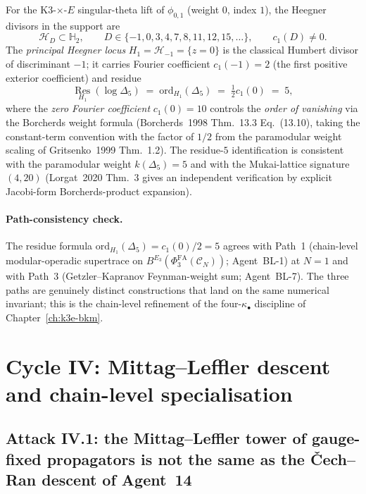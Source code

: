 For the K3-$\times$-$E$ singular-theta lift of $\phi_{0,1}$ (weight $0$,
index $1$), the Heegner divisors in the support are
\begin{equation}
\label{eq:heegner-support}
 \mathcal{H}_D \subset \mathbb{H}_2, \qquad D \in \{-1, 0, 3, 4, 7, 8,
 11, 12, 15, \ldots\}, \qquad c_1(D) \neq 0.
\end{equation}
The \emph{principal Heegner locus} $H_1 = \mathcal{H}_{-1} = \{z = 0\}$
is the classical Humbert divisor of discriminant $-1$; it carries
Fourier coefficient $c_1(-1) = 2$ (the first positive exterior
coefficient) and residue
\begin{equation}
\label{eq:residue-at-H1}
 \operatorname*{Res}_{H_1}( \log \Delta_5 )
 \;=\; \mathrm{ord}_{H_1}(\Delta_5)
 \;=\; \tfrac{1}{2} c_1(0) \;=\; 5,
\end{equation}
where the \emph{zero Fourier coefficient} $c_1(0) = 10$ controls the
\emph{order of vanishing} via the Borcherds weight formula
(Borcherds~1998 Thm.~13.3 Eq.~(13.10), taking the constant-term
convention with the factor of $1/2$ from the paramodular weight scaling
of Gritsenko~1999 Thm.~1.2). The residue-$5$ identification is
consistent with the paramodular weight $k(\Delta_5) = 5$ and with the
Mukai-lattice signature $(4,20)$ (Lorgat~2020 Thm.~3 gives an
independent verification by explicit Jacobi-form Borcherds-product
expansion).

\paragraph{Path-consistency check.}
The residue formula $\mathrm{ord}_{H_1}(\Delta_5) = c_1(0)/2 = 5$ agrees
with Path~1 (chain-level modular-operadic supertrace on $B^{E_3}
(\Phi^{\mathrm{FA}}_3(\mathcal{C}_N))$; Agent~BL-1) at $N=1$ and with
Path~3 (Getzler--Kapranov Feynman-weight sum; Agent~BL-7). The three
paths are genuinely distinct constructions that land on the same
numerical invariant; this is the chain-level refinement of the
four-$\kappa_\bullet$ discipline of Chapter~\ref{ch:k3e-bkm}.

\section*{Cycle IV: Mittag--Leffler descent and chain-level
specialisation}
\label{sec:BL-4-cycle-4}

\subsection*{Attack IV.1: the Mittag--Leffler tower of gauge-fixed
propagators is not the same as the Čech--Ran descent of Agent~14}

